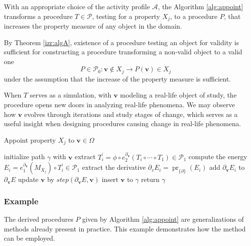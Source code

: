 \documentclass[11pt]{article}
\newcommand{\vv}{\mathbf{v}}
\newcommand{\dP}{\mathcal{P}}
\newcommand{\D}{\partial}
\DeclareMathOperator{\proj}{pr}
\begin{document}
      \begin{theorem}\label{izr:algA}
           With an appropriate choice of the activity profile $\mathcal{A}$, the
           Algorithm \ref{alg:appoint} transforms a procedure $T\in\dP$, testing for a property $X_j$, to a procedure $P$, that increases the property measure of any object in the domain. 
           \end{theorem}
           \begin{corollary}
              By Theorem \ref{izr:algA}, existence of a procedure testing an object for validity is sufficient for constructing a procedure transforming a non-valid object to a valid one
              $$P\in \dP_0:\vv\notin X_j\to P(\vv)\in X_j$$
              under the assumption that the increase of the property measure is sufficient.
              \end{corollary}
              
    When $T$ serves as a simulation, with $\vv$ modeling a real-life object of
    study, the procedure opens new doors in analyzing real-life phenomena. We
    may observe how $\vv$ evolves through iterations and study stages of change,
    which serves as a useful insight when designing procedures causing change in
    real-life phenomena.        
   
   \begin{algorithm}[H]
   \caption{Appoint property $X_j$ to $\vv\in \Omega$}
   \label{alg:appoint}
   \begin{algorithmic}[1]
   \Procedure{Appoint property $X_j$ to $\vv\in \Omega$}{}
   \State initialize path $\gamma$ with $\vv$
   \State extract $T^\prime_i=\phi\circ e^{\D_{\vv}}_2(T_i\circ\cdots\circ T_1)\in\dP_1$
   \State compute the energy $E_i=e^{\D_\vv}_1(M_{X_j})\circ T^\prime_i\in\dP_1$
   \State extract the derivative $\D_v E_i=\proj_{\{\D\}}(E_i)$
   \State add $\D_\vv E_i$ to $\D_\vv E$
   \EndFor
   \State update $\vv$ by $step(\D_\vv E,\vv)$
   \State insert $\vv$ to $\gamma$
   \EndFor
   \State return $\gamma$
   \EndProcedure
   \end{algorithmic}
   \end{algorithm}

   
   \subsubsection{Example}
   
   The derived procedures $P$ given by Algorithm \ref{alg:appoint} are
   generalizations of methods already present in practice. This example
   demonstrates how the method can be employed.   
   
\end{document}

